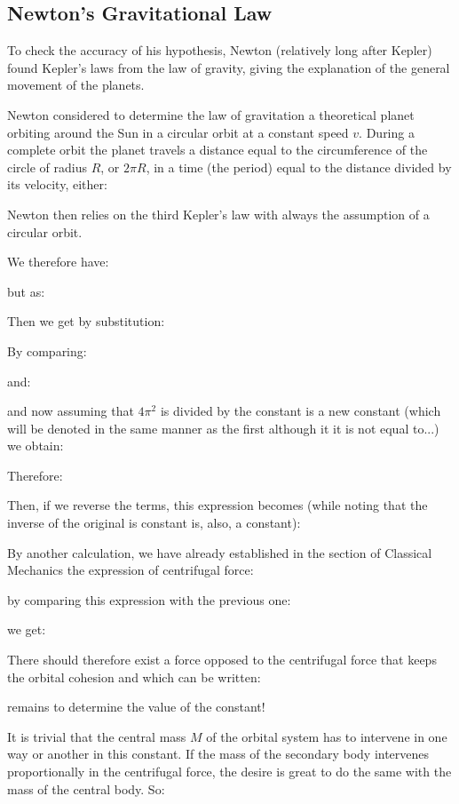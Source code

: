 	\pagebreak
	\subsection{Newton's Gravitational Law}\label{newton gravitational law}
	To check the accuracy of his hypothesis, Newton (relatively long after Kepler) found Kepler's laws from the law of gravity, giving the explanation of the general movement of the planets.
	
	Newton considered to determine the law of gravitation a theoretical planet orbiting around the Sun in a circular orbit at a constant speed $v$. During a complete orbit the planet travels a distance equal to the circumference of the circle of radius $R$, or $2\pi R$, in a time (the period) equal to the distance divided by its velocity, either:
	
	Newton then relies on the third Kepler's law with always the assumption of a circular orbit.
	
	We therefore have:
	
	but as:
	
	Then we get by substitution:
	
	By comparing:
	
	and:
	
	and now assuming that $4\pi^2$ is divided by the constant is a new constant (which will be denoted in the same manner as the first although it it is not equal to...) we obtain:
	
	Therefore:
	
	Then, if we reverse the terms, this expression becomes (while noting that the inverse of the original is constant is, also, a constant):
	
	By another calculation, we have already established in the section of Classical Mechanics the expression of centrifugal force:
	
	by comparing this expression with the previous one:
	
	we get:
	
	There should therefore exist a force opposed to the centrifugal force that keeps the orbital cohesion and which can be written:
	
	remains to determine the value of the constant!
	
	It is trivial that the central mass $M$ of the orbital system has to intervene in one way or another in this constant. If the mass of the secondary body intervenes proportionally in the centrifugal force, the desire is great to do the same with the mass of the central body. So:
	
